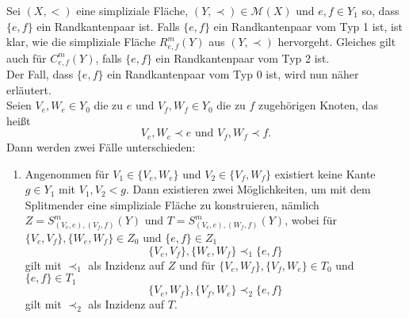 \documentclass[12pt,titlepage]{article}
\newcommand{\gelb}{0.550000011920929}
\begin{document}
\begin{bemerkung}
Sei $(X,<)$ eine simpliziale Fläche, $(Y,\prec)\in \mathcal{M}(X)$ und $e,f \in Y_1$ so, dass $\{e,f\}$ ein Randkantenpaar ist.
 Falls $\{e,f\}$ ein Randkantenpaar vom Typ 1 ist, ist klar, wie die simpliziale Fläche $R^m_{e,f}(Y)$ aus $(Y,\prec)$ hervorgeht. Gleiches gilt auch für $C^m_{e,f}(Y)$, falls $\{e,f\}$ ein Randkantenpaar vom Typ 2 ist.\\
Der Fall, dass $\{e,f\}$ ein Randkantenpaar vom Typ 0 ist, wird nun näher erläutert.\\
Seien $V_e,W_e \in Y_0$ die zu $e$ und $V_f,W_f \in Y_0$ die zu $f$ zugehörigen Knoten, das heißt
\[
V_e,W_e \prec e \text{ und } V_f,W_f \prec f.
\]  
Dann werden zwei Fälle unterschieden:
\begin{enumerate}
\item Angenommen für $V_1\in \{V_e,W_e\}$ und $V_2 \in \{V_f,W_f\}$ existiert keine Kante $g \in Y_1$ mit $V_1,V_2 <g$. Dann existieren zwei Möglichkeiten, um mit dem Splitmender eine simpliziale Fläche zu konstruieren, nämlich $Z=S^m_{(V_e,e),(V_f,f)}(Y)$ und $T=S^m_{(V_e,e),(W_f,f)}(Y)$, 
wobei für $\{V_e,V_f\},\{W_e,W_f\} \in Z_0$ und $\{e,f\} \in Z_1$
\[
\{V_e,V_f\},\{W_e,W_f\}\prec_1 \{e,f\}
\] gilt mit $\prec_1$ als Inzidenz auf $Z$ und für $\{V_e, W_f\},\{V_f,W_e\}\in T_0$ und $\{e,f\}\in T_1$
\[
\{V_e,W_f\},\{V_f,W_e\}\prec_2 \{e,f\} 
\] gilt mit $\prec_2$ als Inzidenz auf $T$.
 \\
\begin{figure}[h] 
\end{figure}
\end{enumerate}
\end{bemerkung}
\end{document}
